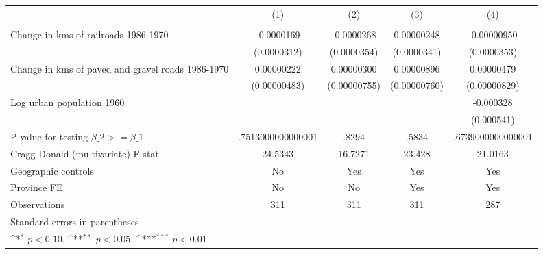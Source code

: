 {
\def\sym#1{\ifmmode^{#1}\else\(^{#1}\)\fi}
\begin{tabular}{l*{4}{c}}
\hline\hline
                &\multicolumn{1}{c}{(1)}&\multicolumn{1}{c}{(2)}&\multicolumn{1}{c}{(3)}&\multicolumn{1}{c}{(4)}\\
                &\multicolumn{1}{c}{}&\multicolumn{1}{c}{}&\multicolumn{1}{c}{}&\multicolumn{1}{c}{}\\
\hline
Change in kms of railroads 1986-1970&-0.0000169         &-0.0000268         &0.00000248         &-0.00000950         \\
                &(0.0000312)         &(0.0000354)         &(0.0000341)         &(0.0000353)         \\
[1em]
Change in kms of paved and gravel roads 1986-1970&0.00000222         &0.00000300         &0.00000896         &0.00000479         \\
                &(0.00000483)         &(0.00000755)         &(0.00000760)         &(0.00000829)         \\
[1em]
Log urban population 1960&                  &                  &                  &-0.000328         \\
                &                  &                  &                  &(0.000541)         \\
\hline
P-value for testing $\beta\_{2} >= \beta\_{1}$&.7513000000000001         &    .8294         &    .5834         &.6739000000000001         \\
Cragg-Donald (multivariate) F-stat&  24.5343         &  16.7271         &   23.428         &  21.0163         \\
Geographic controls&       No         &      Yes         &      Yes         &      Yes         \\
Province FE     &       No         &       No         &      Yes         &      Yes         \\
Observations    &      311         &      311         &      311         &      287         \\
\hline\hline
\multicolumn{5}{l}{\footnotesize Standard errors in parentheses}\\
\multicolumn{5}{l}{\footnotesize \sym{*} \(p<0.10\), \sym{**} \(p<0.05\), \sym{***} \(p<0.01\)}\\
\end{tabular}
}
